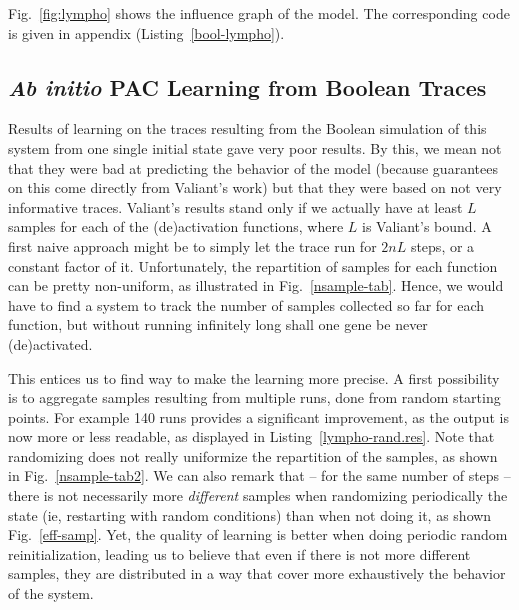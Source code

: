 \documentclass{llncs}
\begin{document}
Fig.~\ref{fig:lympho} shows the influence graph of the model. The
corresponding code is given in appendix (Listing~\ref{bool-lympho}).

\subsection{\emph{Ab initio} PAC Learning from Boolean Traces}
\label{sec:abinitio}

Results of learning on the traces resulting from the Boolean simulation of this system from one single initial state gave very poor results. By this, we mean not that they were bad at predicting the behavior of the model (because guarantees on this come directly from Valiant's work) 
but that they were based on not very informative traces.
Valiant's results stand only if we actually have at least $L$ samples for each of the (de)activation functions, where $L$ is Valiant's bound. A first naive approach might be to simply let the trace run for $2nL$ steps, or a constant factor of it. Unfortunately, the repartition of samples for each function can be pretty non-uniform, as illustrated in Fig.~\ref{nsample-tab}. Hence, we would have to find a system to track the number of samples collected so far for each function, but without running infinitely long shall one gene be never (de)activated.


This entices us to find way to make the learning more precise. A first possibility is to aggregate samples resulting from multiple runs, done from random starting points. For example 140 runs provides a significant improvement, as the output is now more or less readable, as displayed in Listing~\ref{lympho-rand.res}. Note that randomizing does not really uniformize the repartition of the samples, as shown in Fig.~\ref{nsample-tab2}. We can also remark that -- for the same number of steps -- there is not necessarily more \emph{different} samples when randomizing periodically the state (ie, restarting with random conditions) than when not doing it, as shown Fig.~\ref{eff-samp}. Yet, the quality of learning is better when doing periodic random reinitialization, leading us to believe that even if there is not more different samples, they are distributed in a way that cover more exhaustively the behavior of the system.
 
\end{document}
